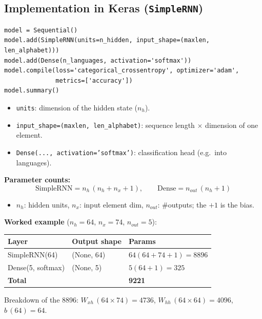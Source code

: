 \documentclass[10pt,a4paper]{article}
\begin{document}
	\subsection{Implementation in Keras (\texttt{SimpleRNN})}

\begin{verbatim}
model = Sequential()
model.add(SimpleRNN(units=n_hidden, input_shape=(maxlen, len_alphabet)))
model.add(Dense(n_languages, activation='softmax'))
model.compile(loss='categorical_crossentropy', optimizer='adam',
              metrics=['accuracy'])
model.summary()
\end{verbatim}

	\begin{itemize}[leftmargin=*]
		\item \texttt{units}: dimension of the hidden state ($n_h$).
		\item \texttt{input\_shape=(maxlen, len\_alphabet)}: sequence length $\times$ dimension of one element.
		\item \texttt{Dense(..., activation='softmax')}: classification head (e.g.\ into languages).
	\end{itemize}

	\begin{formulabox}
		\textbf{Parameter counts:}
		\[
		\text{SimpleRNN} = n_h\,(n_h + n_x + 1), \qquad
		\text{Dense} = n_{out}\,(n_h + 1)
		\]
	\end{formulabox}
	\begin{itemize}[leftmargin=*]
		\item $n_h$: hidden units, \; $n_x$: input element dim, \; $n_{out}$: \#outputs; the $+1$ is the bias.
	\end{itemize}

	\textbf{Worked example} ($n_h=64$, $n_x=74$, $n_{out}=5$):
	\begin{center}
		\begin{tabular}{lll}
			\toprule
			Layer & Output shape & Params \\
			\midrule
			SimpleRNN(64) & (None, 64) & $64(64{+}74{+}1) = 8896$ \\
			Dense(5, softmax) & (None, 5) & $5(64{+}1) = 325$ \\
			\midrule
			\textbf{Total} & & \textbf{9221} \\
			\bottomrule
		\end{tabular}
	\end{center}
	Breakdown of the 8896: $W_{xh}\,(64{\times}74){=}4736$, $W_{hh}\,(64{\times}64){=}4096$, $b\,(64){=}64$.
\end{document}
